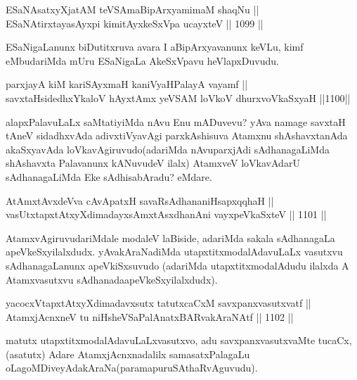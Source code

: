 \begin{shl}
ESaNAsatxyXjatAM teVSAmaBipArxyamimaM shaqNu ||  \\
ESaNAtirxtayasAyxpi kimitAyxkeSxVpa ucayxteV \hfill || 1099 ||  
\end{shl}

\begin{artha}
ESaNigaLanunx biDutitxruva avara I aBipArxyavanunx keVLu, kimf  eMbudariMda mUru ESaNigaLa AkeSxVpavu heVlapxDuvudu.
\end{artha}

\begin{shl}
parxjayA kiM kariSAyxmaH kaniVyaHPalayA vayamf || \\
savxtaHsidedhxYkaloV hAyxtAmx yeVSAM loVkoV dhurxvoV\s kaSxyaH \hfill ||1100||  
\end{shl}

\begin{artha}
alapxPalavuLaLx saMtatiyiMda nAvu Enu mADuvevu? yAva namage savxtaH tAneV sidadhxvAda adivxtiVyavAgi parxkAshisuva Atamxnu shAshavxtanAda akaSxyavAda loVkavAgiruvudo(adariMda nAvu\break parxjAdi sAdhanagaLiMda shAshavxta Palavanunx kANuvudeV ilalx) AtamxveV loVkavAdarU sAdhanagaLiMda Eke sAdhisabAradu? eMdare.
\end{artha}

\begin{shl}
AtAmxtAvxdeVva cAvApatxH savaRsAdhananiHsapxqqhaH || \\
vasUtxtapxtAtxyXdimadayxsAmxtAsxdhanAni vayxpeVkaSxteV \hfill || 1101 ||  
\end{shl}

\begin{artha}
AtamxvAgiruvudariMdale modaleV laBiside, adariMda sakala sAdhanagaLa apeVkeSxyilalxdudx. yAvakAraNadiMda utapxtitx\-\break modalAdavuLaLx vasutxvu sAdhanagaLanunx apeVkiSxsuvudo (adariMda utapxtitxmodalAdudu ilalxda A Atamxvasutxvu sAdhanada\break apeVkeSxyilalxdudx).
\end{artha}

\begin{shl}
yacocxVtapxtAtxyXdimadavxsutx tatutxcaCxM savxpanxvasutxvatf || \\
AtamxjAcnxneV tu niHsheVSaPalAnatxBARvakAraNAtf \hfill || 1102 ||  
\end{shl}

\begin{artha}
matutx utapxtitxmodalAdavuLaLxvasutxvo, adu savxpanxvasutxvaMte tucaCx, (asatutx) Adare AtamxjAcnxnadalilx samasatxPalagaLu oLagoMDiveyAdakAraNa(paramapuruSAthaRvAguvudu).
\end{artha}

